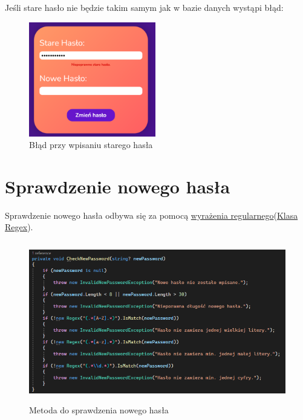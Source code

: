 Jeśli stare hasło nie będzie takim samym jak w bazie danych wystąpi błąd:

\begin{figure}[H]
\begin{center}
    \includegraphics[height=5cm]{images/niepop_stare_hasl.png}
    \caption{Błąd przy wpisaniu starego hasła}
\end{center}
\end{figure}

\section{Sprawdzenie nowego hasła}
Sprawdzenie nowego hasła odbywa się za pomocą {\color{blue}\href{https://en.wikipedia.org/wiki/Regular_expression}{wyrażenia regularnego}}({\color{blue}\href{https://learn.microsoft.com/en-us/dotnet/standard/base-types/regular-expression-language-quick-reference}{Klasa Regex}}).

\begin{figure}[H]
\begin{center}
    \includegraphics[height=7cm]{images/sprawdz_hasl.png}
    \caption{Metoda do sprawdzenia nowego hasła}
\end{center}
\end{figure}

